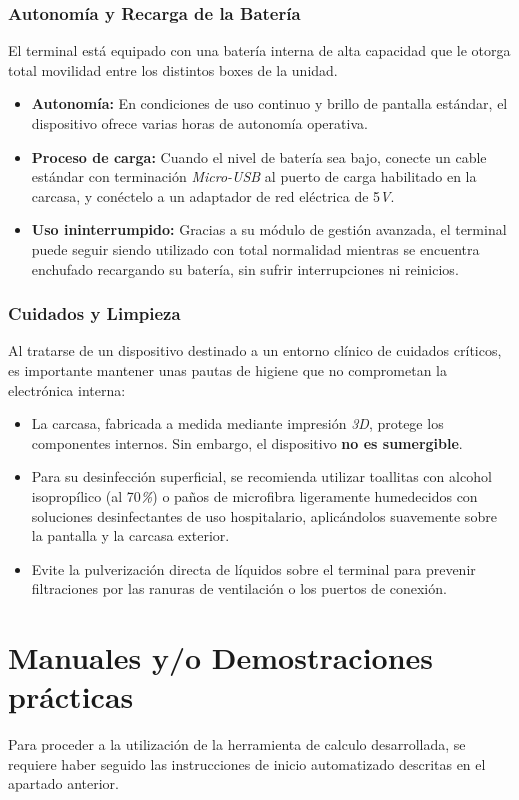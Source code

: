 \subsubsection{Autonomía y Recarga de la Batería}
El terminal está equipado con una batería interna de alta capacidad que le otorga total movilidad entre los distintos boxes de la unidad.
\begin{itemize}
    \item \textbf{Autonomía:} En condiciones de uso continuo y brillo de pantalla estándar, el dispositivo ofrece varias horas de autonomía operativa.
    \item \textbf{Proceso de carga:} Cuando el nivel de batería sea bajo, conecte un cable estándar con terminación \textit{Micro-USB} al puerto de carga habilitado en la carcasa, y conéctelo a un adaptador de red eléctrica de 5\textit{V}. 
    \item \textbf{Uso ininterrumpido:} Gracias a su módulo de gestión avanzada, el terminal puede seguir siendo utilizado con total normalidad mientras se encuentra enchufado recargando su batería, sin sufrir interrupciones ni reinicios.
\end{itemize}

\subsubsection{Cuidados y Limpieza}
Al tratarse de un dispositivo destinado a un entorno clínico de cuidados críticos, es importante mantener unas pautas de higiene que no comprometan la electrónica interna:
\begin{itemize}
    \item La carcasa, fabricada a medida mediante impresión \textit{3D}, protege los componentes internos. Sin embargo, el dispositivo \textbf{no es sumergible}.
    \item Para su desinfección superficial, se recomienda utilizar toallitas con alcohol isopropílico (al 70\textit{\%}) o paños de microfibra ligeramente humedecidos con soluciones desinfectantes de uso hospitalario, aplicándolos suavemente sobre la pantalla y la carcasa exterior.
    \item Evite la pulverización directa de líquidos sobre el terminal para prevenir filtraciones por las ranuras de ventilación o los puertos de conexión.
\end{itemize}

\section{Manuales y/o Demostraciones prácticas}
Para proceder a la utilización de la herramienta de calculo desarrollada, se requiere haber seguido las instrucciones de inicio automatizado descritas en el apartado anterior.

